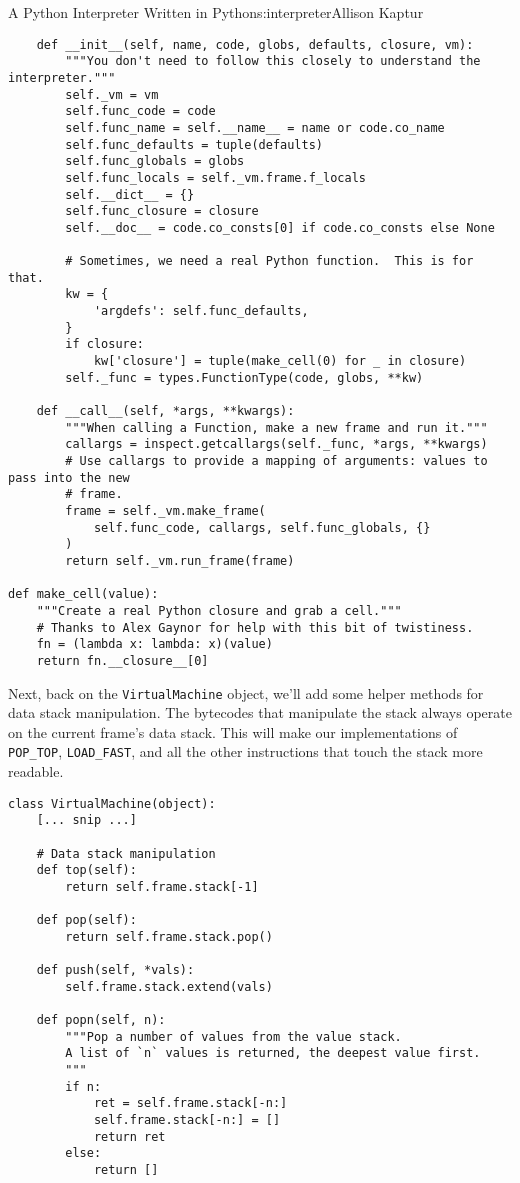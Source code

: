 \begin{aosachapter}{A Python Interpreter Written in Python}{s:interpreter}{Allison Kaptur}
\begin{verbatim}
    def __init__(self, name, code, globs, defaults, closure, vm):
        """You don't need to follow this closely to understand the interpreter."""
        self._vm = vm
        self.func_code = code
        self.func_name = self.__name__ = name or code.co_name
        self.func_defaults = tuple(defaults)
        self.func_globals = globs
        self.func_locals = self._vm.frame.f_locals
        self.__dict__ = {}
        self.func_closure = closure
        self.__doc__ = code.co_consts[0] if code.co_consts else None

        # Sometimes, we need a real Python function.  This is for that.
        kw = {
            'argdefs': self.func_defaults,
        }
        if closure:
            kw['closure'] = tuple(make_cell(0) for _ in closure)
        self._func = types.FunctionType(code, globs, **kw)

    def __call__(self, *args, **kwargs):
        """When calling a Function, make a new frame and run it."""
        callargs = inspect.getcallargs(self._func, *args, **kwargs)
        # Use callargs to provide a mapping of arguments: values to pass into the new 
        # frame.
        frame = self._vm.make_frame(
            self.func_code, callargs, self.func_globals, {}
        )
        return self._vm.run_frame(frame)

def make_cell(value):
    """Create a real Python closure and grab a cell."""
    # Thanks to Alex Gaynor for help with this bit of twistiness.
    fn = (lambda x: lambda: x)(value)
    return fn.__closure__[0]
\end{verbatim}

Next, back on the \texttt{VirtualMachine} object, we'll add some helper
methods for data stack manipulation. The bytecodes that manipulate the
stack always operate on the current frame's data stack. This will make
our implementations of \texttt{POP\_TOP}, \texttt{LOAD\_FAST}, and all
the other instructions that touch the stack more readable.

\begin{verbatim}
class VirtualMachine(object):
    [... snip ...]

    # Data stack manipulation
    def top(self):
        return self.frame.stack[-1]

    def pop(self):
        return self.frame.stack.pop()

    def push(self, *vals):
        self.frame.stack.extend(vals)

    def popn(self, n):
        """Pop a number of values from the value stack.
        A list of `n` values is returned, the deepest value first.
        """
        if n:
            ret = self.frame.stack[-n:]
            self.frame.stack[-n:] = []
            return ret
        else:
            return []
\end{verbatim}


\end{aosachapter}
